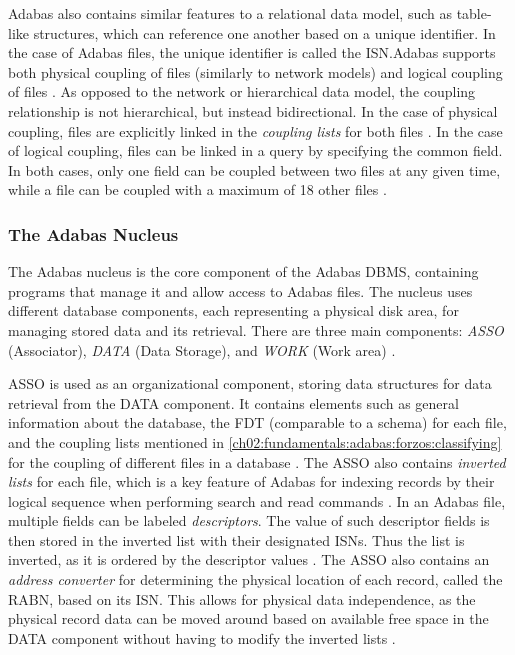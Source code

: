 Adabas also contains similar features to a relational data model, such as table-like structures, which can reference one another based on a unique identifier. In the case of Adabas files, the unique identifier is called the \ac{ISN}.Adabas supports both physical coupling of files (similarly to network models) and logical coupling of files \cite{adabasconcepts}. As opposed to the network or hierarchical data model, the coupling relationship is not hierarchical, but instead bidirectional. In the case of physical coupling, files are explicitly linked in the \textit{coupling lists} for both files \cite{adabashybrid}. In the case of logical coupling, files can be linked in a query by specifying the common field. In both cases, only one field can be coupled between two files at any given time, while a file can be coupled with a maximum of 18 other files \cite{adabasconcepts}. %

\subsubsection{The Adabas Nucleus}
The Adabas nucleus is the core component of the Adabas \ac{DBMS}, containing programs that manage it and allow access to Adabas files. The nucleus uses different database components, each representing a physical disk area, for managing stored data and its retrieval. There are three main components: \textit{ASSO} (Associator), \textit{DATA} (Data Storage), and \textit{WORK} (Work area) \cite{adabasconcepts}.

ASSO is used as an organizational component, storing data structures for data retrieval from the DATA component. It contains elements such as general information about the database, the \ac{FDT} (comparable to a schema) for each file, and the coupling lists mentioned in \ref{ch02:fundamentals:adabas:forzos:classifying} for the coupling of different files in a database \cite{adabasconcepts}. The ASSO also contains \textit{inverted lists} for each file, which is a key feature of Adabas for indexing records by their logical sequence when performing search and read commands \cite{adabashybrid}. In an Adabas file, multiple fields can be labeled \textit{descriptors}. The value of such descriptor fields is then stored in the inverted list with their designated \ac{ISN}s. Thus the list is inverted, as it is ordered by the descriptor values \cite{adabasconcepts}. The ASSO also contains an \textit{address converter} for determining the physical location of each record, called the \ac{RABN}, based on its \ac{ISN}. This allows for physical data independence, as the physical record data can be moved around based on available free space in the DATA component without having to modify the inverted lists \cite{adabashybrid}. 

